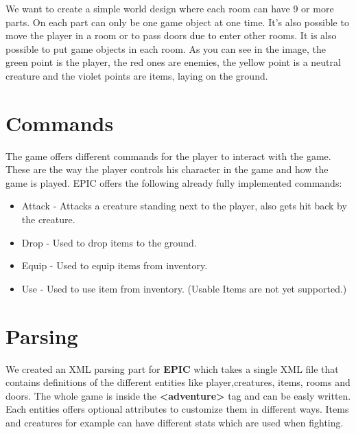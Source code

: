 We want to create a simple world design where each room can have 9 or more parts. On each part can only be one game object at one time. It's also possible to move the player in a room or to pass doors due to enter other rooms. It is also possible to put game objects in each room. As you can see in the image, the green point is the player, the red ones are enemies, the yellow point is a neutral creature and the violet points are items, laying on the ground.

\section{Commands}
The game offers different commands for the player to interact with the game. These are the way the player controls his character in the game and how the game is played.
EPIC offers the following already fully implemented commands:
\begin{itemize}
\item Attack - Attacks a creature standing next to the player, also gets hit back by the creature.
\item Drop - Used to drop items to the ground.
\item Equip - Used to equip items from inventory.
\item Use - Used to use item from inventory. (Usable Items are not yet supported.)
\end{itemize}

\section{Parsing}

We created an XML parsing part for \textbf{EPIC} which takes a single XML file that contains definitions of the different entities like player,creatures, items, rooms and doors. The whole game is inside the \textbf{<adventure>} tag and can be easly written. Each entities offers optional attributes to customize them in different ways.  Items and creatures for example can have different stats which are used when fighting.